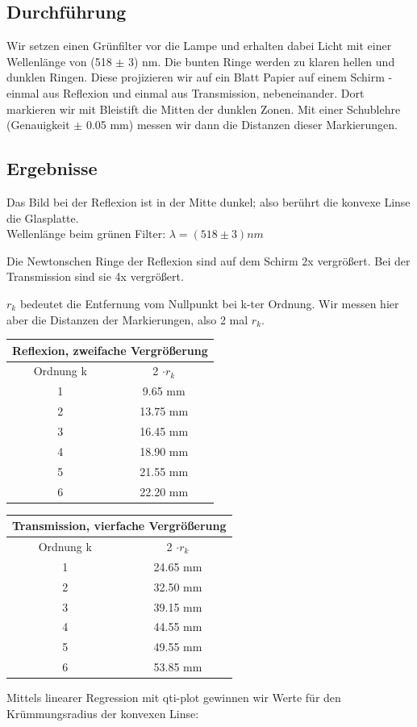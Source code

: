 \documentclass{article}
\begin{document}
\subsection{Durchführung}
Wir setzen einen Grünfilter vor die Lampe und erhalten dabei Licht mit einer Wellenlänge von (518 $\pm$ 3) nm. Die bunten Ringe werden zu klaren hellen und dunklen Ringen. Diese projizieren wir auf ein Blatt Papier auf einem Schirm - einmal aus Reflexion und einmal aus Transmission, nebeneinander. Dort markieren wir mit Bleistift die Mitten der dunklen Zonen. Mit einer Schublehre (Genauigkeit $\pm$ 0.05 mm) messen wir dann die Distanzen dieser Markierungen.
\subsection{Ergebnisse}
Das Bild bei der Reflexion ist in der Mitte dunkel; also berührt die konvexe Linse die Glasplatte. \\
Wellenlänge beim grünen Filter: $\lambda=(518 \pm 3)nm$

Die Newtonschen Ringe der Reflexion sind auf dem Schirm 2x vergrößert. Bei der Transmission sind sie 4x vergrößert.

$r_k$ bedeutet die Entfernung vom Nullpunkt bei k-ter Ordnung. Wir messen hier aber die Distanzen der Markierungen, also 2 mal $r_k$.\\
\begin{center}
\begin{tabular}{|c|c|}
\hline
\multicolumn{2}{|c|}{Reflexion, zweifache Vergrößerung} \\
\hline
Ordnung k & 2 $\cdot r_k$ \\
\hline
\hline
1 & 9.65 mm \\
2 & 13.75 mm  \\
3 & 16.45 mm\\
4 & 18.90 mm\\
5 & 21.55 mm\\
6 & 22.20 mm\\
\hline
\end{tabular}
\begin{tabular}{|c|c|}
\hline
\multicolumn{2}{|c|}{Transmission, vierfache Vergrößerung} \\
\hline
Ordnung k & 2 $\cdot r_k$ \\
\hline
\hline
1 & 24.65 mm \\
2 & 32.50 mm  \\
3 & 39.15 mm\\
4 & 44.55 mm\\
5 & 49.55 mm\\
6 & 53.85 mm\\
\hline
\end{tabular}
\end{center}
Mittels linearer Regression mit qti-plot gewinnen wir Werte für den Krümmungsradius der konvexen Linse:\\
\end{document}
